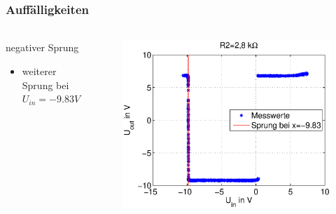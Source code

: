 \begin{frame}
\frametitle{Auffälligkeiten}
\framesubtitle{}
    \begin{columns}[c]
            \begin{block}{negativer Sprung}
                 \begin{itemize}
                     \item weiterer Sprung bei $U_{in} = -9.83V$
                 \end{itemize}
            \end{block}
            \begin{figure}[H]
            \begin{center}
                    \includegraphics[scale=0.3]{./img/plots/Auf_1_2_8_Ohm_2.eps}
            \end{center}
            \end{figure}
    \end{columns}
\end{frame}
